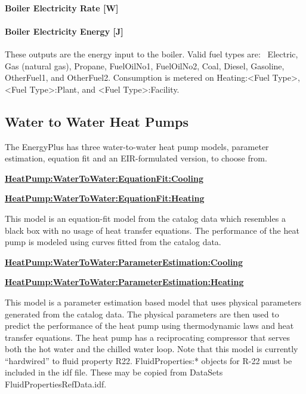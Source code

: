 \paragraph{Boiler Electricity Rate {[}W{]}}\label{boiler-electric-power-w-1}

\paragraph{Boiler Electricity Energy {[}J{]}}\label{boiler-electric-energy-j}

These outputs are the energy input to the boiler. Valid fuel types are:~ Electric, Gas (natural gas), Propane, FuelOilNo1, FuelOilNo2, Coal, Diesel, Gasoline, OtherFuel1, and OtherFuel2. Consumption is metered on Heating:\textless{}Fuel Type\textgreater{}, \textless{}Fuel Type\textgreater{}:Plant, and \textless{}Fuel Type\textgreater{}:Facility.

\subsection{Water to Water Heat Pumps}\label{water-to-water-heat-pumps}

The EnergyPlus has three water-to-water heat pump models, parameter estimation, equation fit and an EIR-formulated version, to choose from.

\textbf{\hyperref[heatpumpwatertowaterequationfitcooling]{HeatPump:WaterToWater:EquationFit:Cooling}}

\textbf{\hyperref[heatpumpwatertowaterequationfitheating]{HeatPump:WaterToWater:EquationFit:Heating}}

This model is an equation-fit model from the catalog data which resembles a black box with no usage of heat transfer equations. The performance of the heat pump is modeled using curves fitted from the catalog data.

\textbf{\hyperref[heatpumpwatertowaterparameterestimationcooling]{HeatPump:WaterToWater:ParameterEstimation:Cooling}}

\textbf{\hyperref[heatpumpwatertowaterparameterestimationheating]{HeatPump:WaterToWater:ParameterEstimation:Heating}}

This model is a parameter estimation based model that uses physical parameters generated from the catalog data. The physical parameters are then used to predict the performance of the heat pump using thermodynamic laws and heat transfer equations. The heat pump has a reciprocating compressor that serves both the hot water and the chilled water loop. Note that this model is currently ``hardwired'' to fluid property R22. FluidProperties:* objects for R-22 must be included in the idf file. These may be copied from DataSets\\FluidPropertiesRefData.idf.

